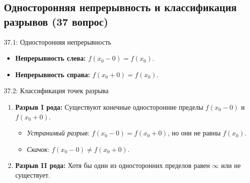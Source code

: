 \documentclass[a4paper,12pt]{article}
\begin{document}
	
	
	
	
	\newpage
	\subsection{Односторонняя непрерывность и классификация разрывов (37 вопрос)}
	
	\begin{definitionbox}{37.1: Односторонняя непрерывность}
		\begin{itemize}
			\item \textbf{Непрерывность слева:} $f(x_0 - 0) = f(x_0)$.
			\item \textbf{Непрерывность справа:} $f(x_0 + 0) = f(x_0)$.
		\end{itemize}
	\end{definitionbox}
	
	\begin{definitionbox}{37.2: Классификация точек разрыва}
		\begin{enumerate}
			\item \textbf{Разрыв I рода:} Существуют конечные односторонние пределы $f(x_0-0)$ и $f(x_0+0)$.
			\begin{itemize}
				\item \textit{Устранимый разрыв}: $f(x_0-0) = f(x_0+0)$, но они не равны $f(x_0)$.
				\item \textit{Скачок}: $f(x_0-0) \neq f(x_0+0)$.
			\end{itemize}
			\item \textbf{Разрыв II рода:} Хотя бы один из односторонних пределов равен $\infty$ или не существует.
		\end{enumerate}
	\end{definitionbox}
	
	\begin{center}
	\end{center}
	
\end{document}
